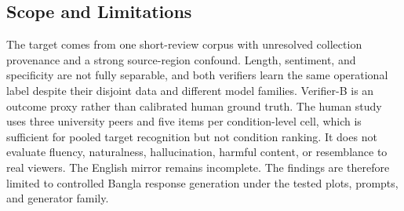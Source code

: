 \subsection{Scope and Limitations}

The target comes from one short-review corpus with unresolved collection provenance and a strong source-region confound. Length, sentiment, and specificity are not fully separable, and both verifiers learn the same operational label despite their disjoint data and different model families. Verifier-B is an outcome proxy rather than calibrated human ground truth. The human study uses three university peers and five items per condition-level cell, which is sufficient for pooled target recognition but not condition ranking. It does not evaluate fluency, naturalness, hallucination, harmful content, or resemblance to real viewers. The English mirror remains incomplete. The findings are therefore limited to controlled Bangla response generation under the tested plots, prompts, and generator family.
